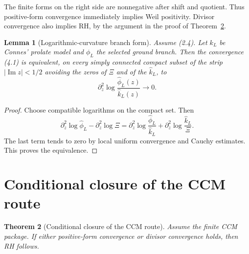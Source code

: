 \documentclass[11pt]{amsart}
\newtheorem{theorem}{Theorem}[section]
\newtheorem{lemma}[theorem]{Lemma}
\theoremstyle{definition}
\theoremstyle{remark}
\newcommand{\XiR}{\Xi}
\begin{document}
The finite forms on the right side are nonnegative after shift and
quotient.  Thus positive-form convergence immediately implies Weil
positivity.  Divisor convergence also implies RH, by the argument in
the proof of Theorem~\ref{thm:closure}.

\begin{lemma}[Logarithmic-curvature branch form]
\label{lem:branch}
Assume (2.4).  Let \(k_L\) be Connes' prolate model and \(\phi_L\) the
selected ground branch.  Then the convergence (4.1) is equivalent, on
every simply connected compact subset of the strip
\(|\operatorname{Im}z|<1/2\) avoiding the zeros of \(\XiR\) and of the
\(\widehat k_L\), to
\[
 \boxed{
 \partial_z^2\log
 \frac{\widehat\phi_L(z)}{\widehat k_L(z)}
 \longrightarrow0 .}
\tag{4.4}
\]
\end{lemma}

\begin{proof}
Choose compatible logarithms on the compact set.  Then
\[
 \partial_z^2\log\widehat\phi_L-\partial_z^2\log\XiR
 =
 \partial_z^2\log\frac{\widehat\phi_L}{\widehat k_L}
 +
 \partial_z^2\log\frac{\widehat k_L}{\XiR}.
\tag{4.5}
\]
The last term tends to zero by local uniform convergence and Cauchy
estimates.  This proves the equivalence.
\end{proof}

\section{Conditional closure of the CCM route}

\begin{theorem}[Conditional closure of the CCM route]
\label{thm:closure}
Assume the finite CCM package.  If either positive-form convergence or
divisor convergence holds, then RH follows.
\end{theorem}
\end{document}
